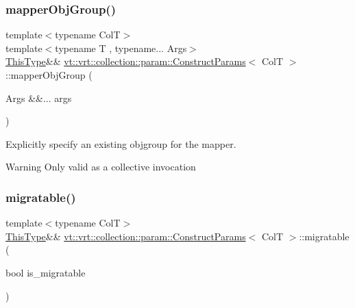\subsubsection{\texorpdfstring{mapper\+Obj\+Group()}{mapperObjGroup()}\hspace{0.1cm}{\footnotesize\ttfamily [2/2]}}
{\footnotesize\ttfamily template$<$typename ColT$>$ \\
template$<$typename T , typename... Args$>$ \\
\hyperlink{structvt_1_1vrt_1_1collection_1_1param_1_1_construct_params_a13d4910c0f6825c7b0ddfebce5288bea}{This\+Type}\&\& \hyperlink{structvt_1_1vrt_1_1collection_1_1param_1_1_construct_params}{vt\+::vrt\+::collection\+::param\+::\+Construct\+Params}$<$ ColT $>$\+::mapper\+Obj\+Group (\begin{DoxyParamCaption}\item[{Args \&\&...}]{args }\end{DoxyParamCaption})\hspace{0.3cm}{\ttfamily [inline]}}



Explicitly specify an existing objgroup for the mapper. 

\begin{DoxyWarning}{Warning}
Only valid as a collective invocation 
\end{DoxyWarning}
\mbox{\label{structvt_1_1vrt_1_1collection_1_1param_1_1_construct_params_ae84568f9ea86b3b5a5aa86eca8962db0}} 
\subsubsection{\texorpdfstring{migratable()}{migratable()}}
{\footnotesize\ttfamily template$<$typename ColT$>$ \\
\hyperlink{structvt_1_1vrt_1_1collection_1_1param_1_1_construct_params_a13d4910c0f6825c7b0ddfebce5288bea}{This\+Type}\&\& \hyperlink{structvt_1_1vrt_1_1collection_1_1param_1_1_construct_params}{vt\+::vrt\+::collection\+::param\+::\+Construct\+Params}$<$ ColT $>$\+::migratable (\begin{DoxyParamCaption}\item[{bool}]{is\+\_\+migratable }\end{DoxyParamCaption})\hspace{0.3cm}{\ttfamily [inline]}}



